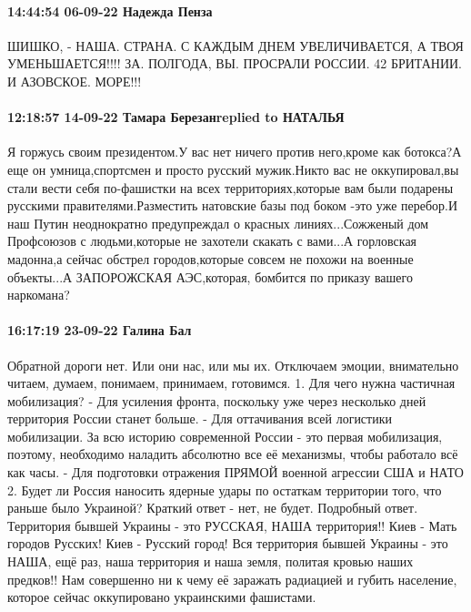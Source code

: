 \paragraph{14:44:54 06-09-22 Надежда Пенза}

ШИШКО, - НАША. СТРАНА. С КАЖДЫМ ДНЕМ УВЕЛИЧИВАЕТСЯ, А ТВОЯ
УМЕНЬШАЕТСЯ!!!!
ЗА. ПОЛГОДА, ВЫ. ПРОСРАЛИ
РОССИИ. 42 %
БРИТАНИИ. И
АЗОВСКОЕ. МОРЕ!!!

\paragraph{12:18:57 14-09-22 Тамара Березанreplied to НАТАЛЬЯ}

Я горжусь своим президентом.У вас нет ничего против него,кроме как ботокса?А
еще он умница,спортсмен и просто русский мужик.Никто вас не оккупировал,вы
стали вести себя по-фашистки на всех территориях,которые вам были подарены
русскими правителями.Разместить натовские базы под боком -это уже перебор.И наш
Путин неоднократно предупреждал о красных линиях...Сожженый дом Профсоюзов с
людьми,которые не захотели скакать с вами...А горловская мадонна,а сейчас
обстрел городов,которые совсем не похожи на военные объекты...А ЗАПОРОЖСКАЯ
АЭС,которая, бомбится по приказу вашего наркомана?


\paragraph{16:17:19 23-09-22 Галина Бал}

Обратной дороги нет. Или они нас, или мы их.
Отключаем эмоции, внимательно читаем, думаем, понимаем, принимаем, готовимся.
1. Для чего нужна частичная мобилизация?
- Для усиления фронта, поскольку уже через несколько дней территория России станет больше.
- Для оттачивания всей логистики мобилизации. За всю историю современной России - это первая мобилизация, поэтому, необходимо наладить абсолютно все её механизмы, чтобы работало всё как часы.
- Для подготовки отражения ПРЯМОЙ военной агрессии США и НАТО
2. Будет ли Россия наносить ядерные удары по остаткам территории того, что раньше было Украиной?
Краткий ответ - нет, не будет.
Подробный ответ. Территория бывшей Украины - это РУССКАЯ, НАША территория!! Киев - Мать городов Русских! Киев - Русский город! Вся территория бывшей Украины - это НАША, ещё раз, наша территория и наша земля, политая кровью наших предков!! Нам совершенно ни к чему её заражать радиацией и губить население, которое сейчас оккупировано украинскими фашистами.


